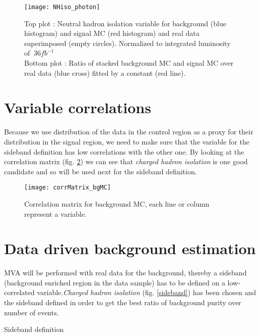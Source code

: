 \begin{figure}[h!]
  \centering
  \texttt{[image: NHiso\_photon]}\\[1cm]
  \caption{Top plot : Neutral hadron isolation variable for background (blue histogram) and signal MC (red histogram) and real data superimposed (empty circles). Normalized to integrated luminosity of $~36fb^{-1}$\\Bottom plot : Ratio of stacked background MC and signal MC over real data (blue cross) fitted by a constant (red line).}
  \label{NHiso_photon_dataVsMCbg}
\end{figure}

\section{Variable correlations}

Because we use distribution of the data in the control region as a proxy for their distribution in the signal region, we need to make sure that the variable for the sideband definition has low correlations with the other one. 
By looking at the correlation matrix (fig. \ref{corrMatrix_bgMC}) we can see that \emph{charged hadron isolation} is one good candidate and so will be used next for the sideband definition.\\

\begin{figure}[ht!]
  \centering
  \texttt{[image: corrMatrix\_bgMC]}\\[1cm]
  \caption{Correlation matrix for background MC, each line or column represent a variable.}
  \label{corrMatrix_bgMC}
\end{figure}

\section{Data driven background estimation}

MVA will be performed with real data for the background, thereby a sideband (background enriched region in the data sample) has to be defined on a low-correlated
variable.\emph{Charged hadron isolation} (fig. \ref{sideband}) has been chosen and the sideband defined in order to get the best ratio of background purity over number of events.
\begin{description}
	\item [Sideband definition]
\end{description}

